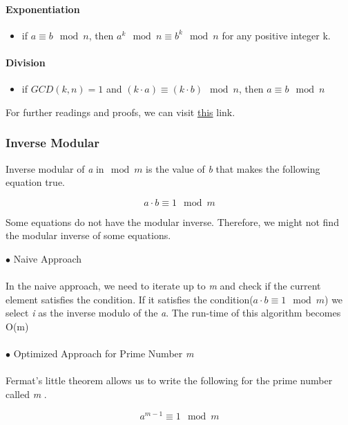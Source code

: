 \documentclass[12pt]{article}
\begin{document}
\paragraph{\textbf{Exponentiation}}
\begin{itemize}
  \item if $a \equiv b \mod{n}$, then $a^k \mod{n} \equiv b^k \mod{n}$ for any positive integer k.
\end{itemize} 

\clearpage

\paragraph{\textbf{Division}}
\begin{itemize}
  \item if $GCD(k, n) = 1$ and $ (k \cdot a) \equiv (k \cdot b) \mod{n} $,  then $a \equiv b \mod{n}$
\end{itemize}

For further readings and proofs, we can visit \href{https://brilliant.org/wiki/modular-arithmetic/ }{this} link.

\subsubsection{Inverse Modular}
Inverse modular of \textit{a} in$\mod{m}$ is the value of \textit{b} that makes the following equation true.

\[ a \cdot b \equiv 1 \mod{m} \]

Some equations do not have the modular inverse. Therefore, we might not find the modular inverse of some equations.

$\bullet$ Naive Approach \\\\
In the naive approach, we need to iterate up to \textit{m} and check if the current element satisfies the condition. If it satisfies the condition($a \cdot b \equiv 1 \mod{m} $) we select \textit{i} as the inverse modulo of the \textit{a}.  The run-time of this algorithm becomes O(m) \\\\

$\bullet$ Optimized Approach for Prime Number \textit{m} \\\\
Fermat's little theorem allows us to write the following for the prime number called \textit{m} \cite{fermant}.

\[ a^{m-1} \equiv 1 \mod{m} \]
\end{document}
